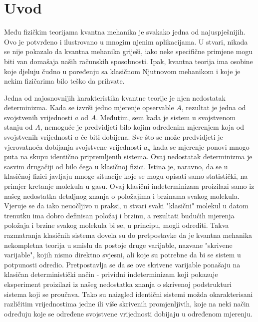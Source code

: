 \chapter{Uvod}

Među fizičkim teorijama kvantna mehanika je svakako jedna od najuspješnijih.
Ovo je potvrđeno i ilustrovano u mnogim njenim aplikacijama.
U stvari, nikada se nije
pokazalo da kvantna mehanika griješi, iako neke specifične primjene mogu biti van
domašaja naših računskih sposobnosti. Ipak, kvantna teorija ima osobine koje djeluju
čudno u poređenju sa klasičnom Njutnovom mehanikom i koje je nekim fizičarima bilo
teško da prihvate.

Jedna od najosnovnijih karakteristika kvantne teorije je njen nedostatak
determinizma. Kada se izvrši jedno mjerenje opservable $A$, rezultat je jedna od
svojstvenih vrijednosti $a$ od $A$. Međutim, sem kada je sistem u svojstvenom stanju od $A$,
nemoguće je predvidjeti bilo kojim određenim mjerenjem koja od svojstvenih vrijednosti $a$
će biti dobijena. Sve što se može predvidjeti je vjerovatnoća dobijanja svojstvene
vrijednosti $a_n$ kada se mjerenje ponovi mnogo puta na skupu identično pripremljenih
sistema. Ovaj nedostatak determinizma je sasvim drugačiji od bilo čega u klasičnoj
fizici. Istina je, naravno, da se u klasičnoj fizici javljaju mnoge situacije koje
se mogu opisati samo statistički, na primjer kretanje molekula u gasu. Ovaj klasični
indeterminizam proizilazi samo iz našeg nedostatka detaljnog znanja o položajima i
brzinama svakog molekula. Vjeruje se da iako neuočljivo u praksi, u stvari svaki
"klasični" molekul u datom trenutku ima dobro definisan položaj i brzinu, a
rezultati budućih mjerenja položaja i brzine svakog molekula bi se, u principu, mogli
odrediti. Takva razmatranja klasičnih sistema dovela su do pretpostavke da je
kvantna mehanika nekompletna teorija u smislu da postoje druge varijable, nazvane
"skrivene varijable", kojih nismo direktno svjesni, ali koje su potrebne da bi se
sistem u potpunosti odredio. Pretpostavlja se da se ove skrivene varijable ponašaju
na klasičan deterministički način - prividni indeterminizam koji pokazuje
eksperiment proizilazi iz našeg nedostatka znanja o skrivenoj podstrukturi sistema
koji se proučava. Tako su naizgled identični sistemi možda okarakterisani različitim
vrijednostima jedne ili više skrivenih promjenljivih, koje na neki način određuju koje
se određene svojstvene vrijednosti dobijaju u određenom mjerenju.

